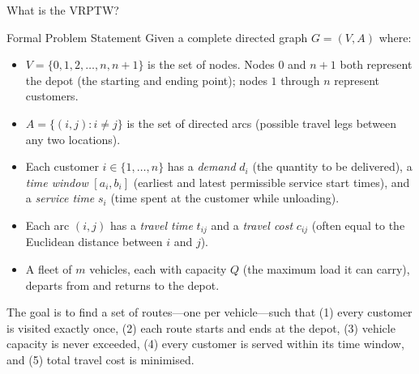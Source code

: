 \documentclass[aspectratio=169,10pt]{beamer}
\begin{document}
\begin{frame}[allowframebreaks]{What is the VRPTW?}
\begin{block}{Formal Problem Statement}
Given a complete directed graph $G = (V, A)$ where:
\begin{itemize}
  \item $V = \{0, 1, 2, \ldots, n, n+1\}$ is the set of nodes.  Nodes $0$ and
    $n+1$ both represent the depot (the starting and ending point); nodes $1$
    through $n$ represent customers.
  \item $A = \{(i,j) : i \neq j\}$ is the set of directed arcs (possible travel
    legs between any two locations).
  \item Each customer $i \in \{1,\ldots,n\}$ has a \emph{demand} $d_i$ (the
    quantity to be delivered), a \emph{time window} $[a_i, b_i]$ (earliest and
    latest permissible service start times), and a \emph{service time} $s_i$
    (time spent at the customer while unloading).
  \item Each arc $(i,j)$ has a \emph{travel time} $t_{ij}$ and a \emph{travel
    cost} $c_{ij}$ (often equal to the Euclidean distance between $i$ and $j$).
  \item A fleet of $m$ vehicles, each with capacity $Q$ (the maximum load it can
    carry), departs from and returns to the depot.
\end{itemize}
The goal is to find a set of routes---one per vehicle---such that (1) every
customer is visited exactly once, (2) each route starts and ends at the depot,
(3) vehicle capacity is never exceeded, (4) every customer is served within its
time window, and (5) total travel cost is minimised.
\end{block}

\end{frame}
\end{document}
